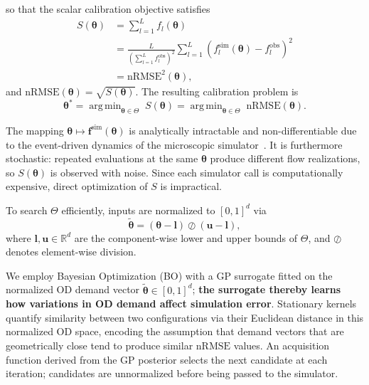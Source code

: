 \documentclass[11pt]{article}
\DeclareMathOperator*{\argmin}{arg\,min}
\begin{document}
so that the scalar calibration objective satisfies
\begin{align}
S(\boldsymbol{\theta})
&= \sum_{l=1}^{L} f_l(\boldsymbol{\theta}) \label{eq:nrmse2} \\
&= \frac{L}{\left(\sum_{l=1}^{L} f_l^{\mathrm{obs}}\right)^2}
\sum_{l=1}^{L}
\left(f_l^{\mathrm{sim}}(\boldsymbol{\theta}) - f_l^{\mathrm{obs}}\right)^2 \nonumber \\
&= \mathrm{nRMSE}^2(\boldsymbol{\theta}), \nonumber
\end{align}
and $\mathrm{nRMSE}(\boldsymbol{\theta}) = \sqrt{S(\boldsymbol{\theta})}$.
The resulting calibration problem is
\begin{equation}
    \boldsymbol{\theta}^*
    =
    \argmin_{\boldsymbol{\theta}\in\Theta}
    \;S(\boldsymbol{\theta}) = \argmin_{\boldsymbol{\theta}\in\Theta}
    \;\mathrm{nRMSE}(\boldsymbol{\theta}).
    \label{eq:calibration_problem}
\end{equation}


The mapping
$\boldsymbol{\theta} \mapsto \mathbf{f}^{\mathrm{sim}}(\boldsymbol{\theta})$
is analytically intractable and non-differentiable due to the event-driven
dynamics of the microscopic
simulator~\parencite{balakrishna2007calibration}. It is furthermore
stochastic: repeated evaluations at the same $\boldsymbol{\theta}$ produce
different flow realizations, so $S(\boldsymbol{\theta})$ is observed with
noise. Since each simulator call is computationally expensive, direct
optimization of $S$ is impractical.

To search $\Theta$ efficiently, inputs are normalized to $[0,1]^d$ via
\begin{equation}
    \tilde{\boldsymbol{\theta}}
    = (\boldsymbol{\theta} - \mathbf{l}) \oslash (\mathbf{u} - \mathbf{l}),
    \label{eq:norm}
\end{equation}
where $\mathbf{l}, \mathbf{u} \in \mathbb{R}^d$ are the component-wise lower
and upper bounds of $\Theta$, and $\oslash$ denotes element-wise division.

We employ Bayesian
Optimization (BO) with a GP surrogate fitted on the normalized OD demand
vector $\tilde{\boldsymbol{\theta}} \in [0,1]^d$; \textbf{the surrogate thereby
learns how variations in OD demand affect simulation error}. Stationary
kernels quantify similarity between two configurations via their Euclidean
distance in this normalized OD space, encoding the assumption that demand
vectors that are geometrically close tend to produce similar
$\mathrm{nRMSE}$ values.
An acquisition function derived from the GP posterior selects the next
candidate at each iteration; candidates are unnormalized before being
passed to the simulator.
\end{document}
